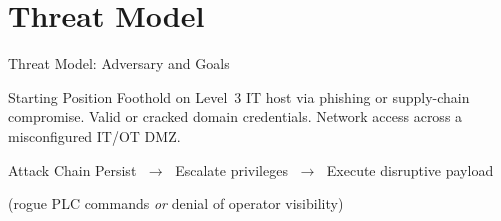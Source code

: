 \documentclass[aspectratio=169]{beamer}
\begin{document}
\section{Threat Model}

\begin{frame}{Threat Model: Adversary and Goals}
  \begin{block}{Starting Position}
    Foothold on Level~3 IT host via phishing or supply-chain compromise.
    Valid or cracked domain credentials.
    Network access across a misconfigured IT/OT DMZ.
  \end{block}

  \vspace{0.8em}
  \begin{block}{Attack Chain}
    \centering
    \large
    Persist $\;\longrightarrow\;$ Escalate privileges $\;\longrightarrow\;$
    Execute disruptive payload

    \vspace{0.3em}
    \normalsize
    (rogue PLC commands \textit{or} denial of operator visibility)
  \end{block}
\end{frame}
\end{document}
